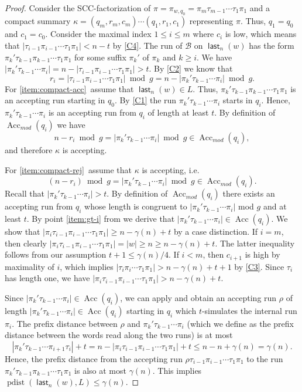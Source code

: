 \documentclass{theoretics}
\newcommand{\B}{\mathcal{B}}
\DeclareMathOperator{\last}{\mathsf{last}}
\DeclareMathOperator{\pdist}{pdist}
\DeclareMathOperator{\Acc}{Acc}
\renewcommand{\geq}{\geqslant}
\renewcommand{\leq}{\leqslant}
\renewcommand{\ge}{\geq}
\renewcommand{\le}{\leq}
\begin{document}
\begin{proof}
Consider the SCC-factorization of $\pi = \pi_{w,q_0} = \pi_m \tau_{m-1} \cdots \tau_1 \pi_1$
and a compact summary $\kappa = (q_m, r_m, c_m) \cdots (q_1, r_1, c_1)$ representing $\pi$.
Thus, $q_1 = q_0$ and $c_1 = c_0$.
Consider the maximal index $1 \le i \le m$ where $c_i$ is low,
which means that $|\tau_{i-1} \pi_{i-1} \cdots \tau_1 \pi_1| < n-t$ by \ref{C4}.
The run of $\B$ on $\last_n(w)$ has the form $\pi_k' \tau_{k-1} \pi_{k-1} \cdots \tau_1 \pi_1$
for some suffix $\pi_k'$ of $\pi_k$ and $k \geq i$.
We have $|\pi_k' \tau_{k-1} \cdots \pi_i| = n - |\tau_{i-1} \pi_{i-1} \cdots \tau_1 \pi_1| > t$.
By \ref{C2} we know that
\[
	r_i = |\tau_{i-1} \pi_{i-1} \cdots \tau_1 \pi_1| \bmod {g} = n - |\pi_k' \tau_{k-1} \cdots \pi_i| \bmod {g}.
\]
For \ref{item:compact-acc}~assume that $\last_n(w) \in L$.
Thus, $\pi_k' \tau_{k-1} \pi_{k-1} \cdots \tau_1 \pi_1$
is an accepting run starting in $q_0$.
By \ref{C1} the run $\pi_k' \tau_{k-1} \cdots \pi_i$ starts in $q_i$.
Hence, $\pi_k' \tau_{k-1} \cdots \pi_i$ is an accepting run from $q_i$ of length at least $t$.
By definition of $\Acc_{\mathit{mod}}(q_i)$ we have
\[
	n - r_i \bmod {g} = |\pi_k' \tau_{k-1} \cdots \pi_i| \bmod {g}  \in \Acc_{\mathit{mod}}(q_i),
\]
and therefore $\kappa$ is accepting.

For \ref{item:compact-rej}~assume that $\kappa$ is accepting,
i.e.
\[
	(n - r_i) \bmod g = |\pi_k' \tau_{k-1} \cdots \pi_i|  \bmod g \in \Acc_{\mathit{mod}}(q_i).
\]
Recall that $|\pi_k' \tau_{k-1} \cdots \pi_i| > t$.
By definition of $\Acc_{\mathit{mod}}(q_i)$ there exists an accepting run from $q_i$
whose length is congruent to $|\pi_k' \tau_{k-1} \cdots \pi_i|$ mod $g$
and at least $t$.
By point \ref{item:gt-i} from  we derive that $|\pi_k' \tau_{k-1} \cdots \pi_i| \in \Acc(q_i)$.
We show that $|\pi_i \tau_{i-1} \pi_{i-1} \cdots \tau_1 \pi_1| \ge n-\gamma(n)+t$ by a case distinction.
If $i = m$, then clearly $|\pi_i \tau_{i-1} \pi_{i-1} \cdots \tau_1 \pi_1| = |w| \ge n \ge n-\gamma(n)+t$.
The latter inequality follows from our assumption $t+1 \le \gamma(n)/4$.
If $i < m$, then $c_{i+1}$ is high by maximality of $i$,
which implies $|\tau_i \pi_i \cdots \tau_1 \pi_1| > n-\gamma(n) + t+1$ by \ref{C3}.
Since $\tau_i$ has length one, we have
$|\pi_i \tau_{i-1} \pi_{i-1} \cdots \tau_1 \pi_1| > n-\gamma(n)+t$.

Since $|\pi_k' \tau_{k-1} \cdots \pi_i| \in \Acc(q_i)$,
we can apply  and obtain an accepting run $\rho$
of length $|\pi_k' \tau_{k-1} \cdots \pi_i| \in \Acc(q_i)$ starting in $q_i$
which $t$-simulates the internal run $\pi_i$.
The prefix distance between $\rho$ and $\pi_k' \tau_{k-1} \cdots \pi_i$ (which we define as the prefix
distance between the words read along the two runs) is at most
\[
	|\pi_k' \tau_{k-1} \cdots \pi_{i+1} \tau_i| + t = n - |\pi_i \tau_{i-1} \pi_{i-1} \cdots \tau_1 \pi_1| + t \le n
	- n+\gamma(n) = \gamma(n).
\]
Hence, the prefix distance from the accepting run $\rho \tau_{i-1} \pi_{i-1} \cdots \tau_1 \pi_1$
to the run $\pi_k' \tau_{k-1} \pi_{k-1} \cdots \tau_1 \pi_1$ is also at most $\gamma(n)$.
This implies  $\pdist(\last_n(w),L) \le \gamma(n)$.
\end{proof}
\end{document}
